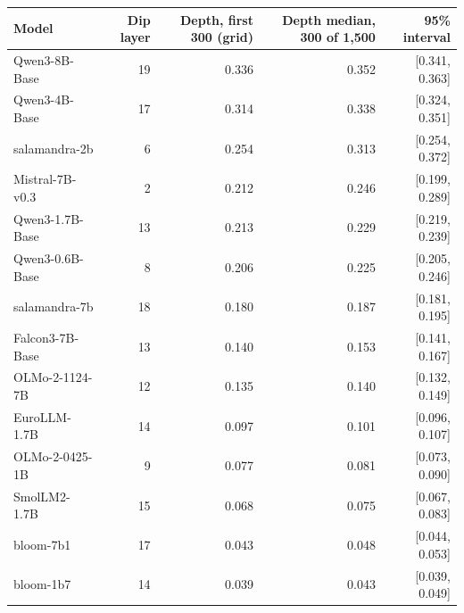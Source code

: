 \begin{center}\scriptsize
\begin{tabular}{lrrrr}
\toprule
Model & Dip layer & Depth, first 300 (grid) & Depth median, 300 of 1,500 & 95\% interval \\
\midrule
Qwen3-8B-Base & 19 & 0.336 & 0.352 & [0.341, 0.363] \\
Qwen3-4B-Base & 17 & 0.314 & 0.338 & [0.324, 0.351] \\
salamandra-2b & 6 & 0.254 & 0.313 & [0.254, 0.372] \\
Mistral-7B-v0.3 & 2 & 0.212 & 0.246 & [0.199, 0.289] \\
Qwen3-1.7B-Base & 13 & 0.213 & 0.229 & [0.219, 0.239] \\
Qwen3-0.6B-Base & 8 & 0.206 & 0.225 & [0.205, 0.246] \\
salamandra-7b & 18 & 0.180 & 0.187 & [0.181, 0.195] \\
Falcon3-7B-Base & 13 & 0.140 & 0.153 & [0.141, 0.167] \\
OLMo-2-1124-7B & 12 & 0.135 & 0.140 & [0.132, 0.149] \\
EuroLLM-1.7B & 14 & 0.097 & 0.101 & [0.096, 0.107] \\
OLMo-2-0425-1B & 9 & 0.077 & 0.081 & [0.073, 0.090] \\
SmolLM2-1.7B & 15 & 0.068 & 0.075 & [0.067, 0.083] \\
bloom-7b1 & 17 & 0.043 & 0.048 & [0.044, 0.053] \\
bloom-1b7 & 14 & 0.039 & 0.043 & [0.039, 0.049] \\
\bottomrule
\end{tabular}
\end{center}
